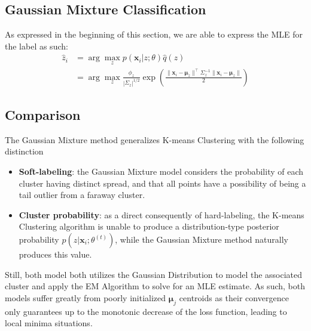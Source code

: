 \subsection{Gaussian Mixture Classification}
As expressed in the beginning of this section, we are able to express the MLE for the label as such:
\begin{align*}
    \hat{z}_i
    &= \arg\max_z p(\mathbf{x}_i|z;\theta)\hat{q}(z) \\
    &= \arg\max_z \frac{\phi_z}{|\Sigma_z|^{1/2}} \exp\left(\frac{\|\mathbf{x}_i-\boldsymbol{\mu}_z\|^\top\Sigma_z^{-1}\|\mathbf{x}_i-\boldsymbol{\mu}_z\|}{2}\right)
\end{align*}
\subsection{Comparison}
The Gaussian Mixture method generalizes K-means Clustering with the following distinction
\begin{itemize}
    \item \textbf{Soft-labeling}: the Gaussian Mixture model considers the probability of each cluster having distinct spread, and that all points have a possibility of being a tail outlier from a faraway cluster.
    \item \textbf{Cluster probability}: as a direct consequently of hard-labeling, the K-means Clustering algorithm is unable to produce a distribution-type posterior probability $p(z|\mathbf{x}_i;\theta^{(t)})$, while the Gaussian Mixture method naturally produces this value.
\end{itemize}
Still, both model both utilizes the Gaussian Distribution to model the associated cluster and apply the EM Algorithm to solve for an MLE estimate. As such, both models suffer greatly from poorly initialized $\boldsymbol{\mu}_j$ centroids as their convergence only guarantees up to the monotonic decrease of the loss function, leading to local minima situations.